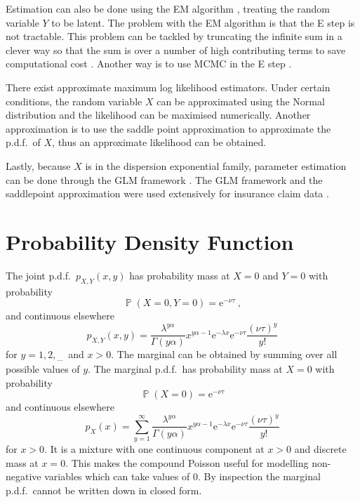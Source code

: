 \documentclass[a4paper]{proc}
\DeclareMathOperator{\prob}{\mathbb{P}}
\newcommand{\euler}{\mathrm{e}}
\newcommand{\dotdotdot}{_{\phantom{.}\cdots}}
\begin{document}
Estimation can also be done using the EM algorithm \cite{dempster1977maximum}, treating the random variable $Y$ to be latent. The problem with the EM algorithm is that the E step is not tractable. This problem can be tackled by truncating the infinite sum in a clever way so that the sum is over a number of high contributing terms to save computational cost \cite{dunn2005series}. Another way is to use MCMC in the E step \cite{booth1999maximizing}.

There exist approximate maximum log likelihood estimators. Under certain conditions, the random variable $X$ can be approximated using the Normal distribution and the likelihood can be maximised numerically. Another approximation is to use the saddle point approximation \cite{daniels1954saddlepoint} to approximate the p.d.f.~of $X$, thus an approximate likelihood can be obtained.

Lastly, because $X$ is in the dispersion exponential family, parameter estimation can be done through the GLM framework \cite{zhang2013likelihood}. The GLM framework and the saddlepoint approximation were used extensively for insurance claim data \cite{jorgensen1994fitting} \cite{jensen1991saddlepoint}.

\section{Probability Density Function}
The joint p.d.f.~$p_{X,Y}(x,y)$ has probability mass at $X=0$ and $Y=0$ with probability
\begin{equation}
\prob\left(X=0,Y=0\right)=\euler^{-\nu\tau} \ ,
\end{equation}
and continuous elsewhere
\begin{equation}
p_{X,Y}(x,y)=\frac{\lambda^{y\alpha}}{\Gamma(y\alpha)}x^{y\alpha-1}\euler^{-\lambda x}\euler^{-\nu\tau}\frac{(\nu\tau)^y}{y!}
\end{equation}
for $y=1,2,\dotdotdot$ and $x>0$. The marginal can be obtained by summing over all possible values of $y$. The marginal p.d.f.~has probability mass at $X=0$ with probability
\begin{equation}
\prob(X=0)=\euler^{-\nu\tau}
\end{equation}
and continuous elsewhere
\begin{equation}
p_{X}(x)=\sum_{y=1}^{\infty}\frac{\lambda^{y\alpha}}{\Gamma(y\alpha)}x^{y\alpha-1}\euler^{-\lambda x}\euler^{-\nu\tau}\frac{(\nu\tau)^y}{y!}
\end{equation}
for $x>0$. It is a mixture with one continuous component at $x>0$ and discrete mass at $x=0$. This makes the compound Poisson useful for modelling non-negative variables which can take values of 0. By inspection the marginal p.d.f.~cannot be written down in closed form.
\end{document}
